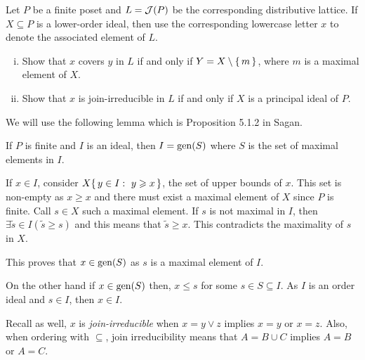 \documentclass[12pt]{memoir}
\begin{document}
\begin{Ej}
    Let $P$ be a finite poset and $L=\mathcal{J}(P)$ be the corresponding distributive lattice. If $X\subseteq P$ is a lower-order ideal, then use the corresponding lowercase letter $x$ to denote the associated element of $L$. 
    \begin{enumerate}[i)]
        \itemsep=-0.4em
        \item Show that $x$ covers $y$ in $L$ if and only if $Y=X\setminus\{\,m\,\}$, where $m$ is a maximal element of $X$.
        \item Show that $x$ is join-irreducible in $L$ if and only if $X$ is a principal ideal of $P$. %
    \end{enumerate}
 \end{Ej}

 We will use the following lemma which is Proposition 5.1.2 in Sagan. 

 \begin{Lem}
If $P$ is finite and $I$ is an ideal, then $I=\operatorname{gen}(S)$ where $S$ is the set of maximal elements in $I$. 
 \end{Lem}

\begin{ptcbp}
If $x\in I$, consider $X\{\,y\in I:\ y\geqslant x\,\}$, the set of upper bounds of $x$. This set is non-empty as $x\geq x$ and there must exist a maximal element of $X$ since $P$ is finite. Call $s\in X$ such a maximal element. If $s$ is not maximal in $I$, then $\exists \tilde{s}\in I(\tilde{s}\geq s)$ and this means that $\tilde{s}\geq x$. This contradicts the maximality of $s$ in $X$.\par 
This proves that $x\in\operatorname{gen}(S)$ as $s$ is a maximal element of $I$.\par 
On the other hand if $x\in\operatorname{gen}(S)$ then, $x\leq s$ for some $s\in S\subseteq I$. As $I$ is an order ideal and $s\in I$, then $x\in I$. 
\end{ptcbp}

Recall as well, $x$ is \emph{join-irreducible} when $x=y\lor z$ implies $x=y$ or $x=z$. Also, when ordering with $\subseteq$, join irreducibility means that $A= B\cup C$ implies $A=B$ or $A=C$. 
\end{document}
